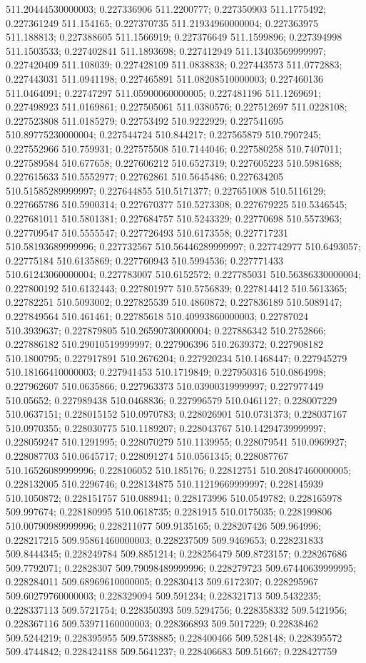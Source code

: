 511.20444530000003; 0.227336906 511.2200777; 0.227350903 511.1775492; 0.227361249 511.154165; 0.227370735 511.21934960000004; 0.227363975 511.188813; 0.227388605 511.1566919; 0.227376649 511.1599896; 0.227394998 511.1503533; 0.227402841 511.1893698; 0.227412949 511.13403569999997; 0.227420409 511.108039; 0.227428109 511.0838838; 0.227443573 511.0772883; 0.227443031 511.0941198; 0.227465891 511.08208510000003; 0.227460136 511.0464091; 0.22747297 511.05900060000005; 0.227481196 511.1269691; 0.227498923 511.0169861; 0.227505061 511.0380576; 0.227512697 511.0228108; 0.227523808 511.0185279; 0.22753492 510.9222929; 0.227541695 510.89775230000004; 0.227544724 510.844217; 0.227565879 510.7907245; 0.227552966 510.759931; 0.227575508 510.7144046; 0.227580258 510.7407011; 0.227589584 510.677658; 0.227606212 510.6527319; 0.227605223 510.5981688; 0.227615633 510.5552977; 0.22762861 510.5645486; 0.227634205 510.51585289999997; 0.227644855 510.5171377; 0.227651008 510.5116129; 0.227665786 510.5900314; 0.227670377 510.5273308; 0.227679225 510.5346545; 0.227681011 510.5801381; 0.227684757 510.5243329; 0.22770698 510.5573963; 0.227709547 510.5555547; 0.227726493 510.6173558; 0.227717231 510.58193689999996; 0.227732567 510.56446289999997; 0.227742977 510.6493057; 0.22775184 510.6135869; 0.227760943 510.5994536; 0.227771433 510.61243060000004; 0.227783007 510.6152572; 0.227785031 510.56386330000004; 0.227800192 510.6132443; 0.227801977 510.5756839; 0.227814412 510.5613365; 0.22782251 510.5093002; 0.227825539 510.4860872; 0.227836189 510.5089147; 0.227849564 510.461461; 0.22785618 510.40993860000003; 0.22787024 510.3939637; 0.227879805 510.26590730000004; 0.227886342 510.2752866; 0.227886182 510.29010519999997; 0.227906396 510.2639372; 0.227908182 510.1800795; 0.227917891 510.2676204; 0.227920234 510.1468447; 0.227945279 510.18166410000003; 0.227941453 510.1719849; 0.227950316 510.0864998; 0.227962607 510.0635866; 0.227963373 510.03900319999997; 0.227977449 510.05652; 0.227989438 510.0468836; 0.227996579 510.0461127; 0.228007229 510.0637151; 0.228015152 510.0970783; 0.228026901 510.0731373; 0.228037167 510.0970355; 0.228030775 510.1189207; 0.228043767 510.14294739999997; 0.228059247 510.1291995; 0.228070279 510.1139955; 0.228079541 510.0969927; 0.228087703 510.0645717; 0.228091274 510.0561345; 0.228087767 510.16526089999996; 0.228106052 510.185176; 0.22812751 510.20847460000005; 0.228132005 510.2296746; 0.228134875 510.11219669999997; 0.228145939 510.1050872; 0.228151757 510.088941; 0.228173996 510.0549782; 0.228165978 509.997674; 0.228180995 510.0618735; 0.2281915 510.0175035; 0.228199806 510.00790989999996; 0.228211077 509.9135165; 0.228207426 509.964996; 0.228217215 509.95861460000003; 0.228237509 509.9469653; 0.228231833 509.8444345; 0.228249784 509.8851214; 0.228256479 509.8723157; 0.228267686 509.7792071; 0.22828307 509.79098489999996; 0.228279723 509.67440639999995; 0.228284011 509.68969610000005; 0.22830413 509.6172307; 0.228295967 509.60279760000003; 0.228329094 509.591234; 0.228321713 509.5432235; 0.228337113 509.5721754; 0.228350393 509.5294756; 0.228358332 509.5421956; 0.228367116 509.53971160000003; 0.228366893 509.5017229; 0.22838462 509.5244219; 0.228395955 509.5738885; 0.228400466 509.528148; 0.228395572 509.4744842; 0.228424188 509.5641237; 0.228406683 509.51667; 0.228427759 